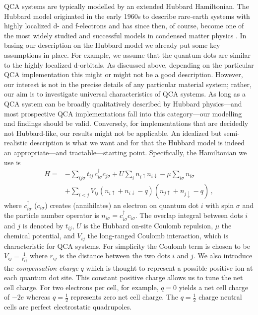 QCA systems are typically modelled by an extended Hubbard Hamiltonian. The
Hubbard model originated in the early 1960s to describe rare-earth systems with
highly localized d- and f-electrons and has since then, of course, become one of
the most widely studied and successful models in condensed matter physics
\cite{Hubbard1964}. In basing our description on the Hubbard model we already
put some key assumptions in place. For example, we assume that the quantum dots
are similar to the highly localized d-orbitals. As discussed above, depending on
the particular QCA implementation this might or might not be a good description.
However, our interest is not in the precise details of any particular material
system; rather, our aim is to investigate universal characteristics of QCA systems.
As long as a QCA system can be broadly qualitatively described by Hubbard
physics---and most prospective QCA implementations fall into this category---our
modelling and findings should be valid. Conversely, for implementations that are
decidedly not Hubbard-like, our results might not be applicable. An idealized
but semi-realistic description is what we want and for that the Hubbard model is
indeed an appropriate---and tractable---starting point. Specifically, the
Hamiltonian we use is
\begin{equation}
\begin{split}
  \label{eq:H_QCA}
  H =
    &- \sum_{ij\sigma} t_{ij} \, c^{\dagger}_{i\sigma} c_{j\sigma}
    + U \sum_i n_{i\uparrow} n_{i\downarrow}
    - \mu \sum_{i\sigma} n_{i\sigma} \\
    &+ \sum_{i<j} V_{ij} \left( n_{i\uparrow} + n_{i\downarrow} - q \right) 
                        \left( n_{j\uparrow} + n_{j\downarrow} - q \right) \, ,
\end{split}
\end{equation}
where $c^{\dagger}_{i\sigma}$ ($c_{i\sigma}$) creates (annihilates) an electron
on quantum dot $i$ with spin $\sigma$ and the particle number operator is
$n_{i\sigma} = c^{\dagger}_{i\sigma} c_{i\sigma}$. The overlap integral between
dots $i$ and $j$ is denoted by $t_{ij}$, $U$ is the Hubbard on-site Coulomb
repulsion, $\mu$ the chemical potential, and $V_{ij}$ the long-ranged Coulomb
interaction, which is characteristic for QCA systems. For simplicity the Coulomb
term is chosen to be $V_{ij} = \frac{1}{r_{ij}}$ where $r_{ij}$ is the distance
between the two dots $i$ and $j$. We also introduce the \emph{compensation
charge} $q$ which is thought to represent a possible positive ion at each
quantum dot site. This constant positive charge allows us to tune the net cell
charge. For two electrons per cell, for example, $q=0$ yields a net cell charge
of $-2e$ whereas $q = \frac{1}{2}$ represents zero net cell charge. The $q =
\frac{1}{2}$ charge neutral cells are perfect electrostatic quadrupoles.


